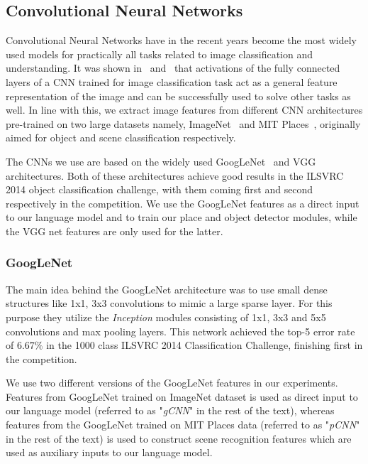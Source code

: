 \subsection{Convolutional Neural Networks}
Convolutional Neural Networks have in the recent years become the most widely
used models for practically all tasks related to image classification and
understanding.
It was shown in~\cite{Donahue2014} and~\cite{Razavian2014CVPR} that activations
of the fully connected layers of a CNN trained for image classification task act
as a general feature representation of the image and can be successfully used to
solve other tasks as well.
In line with this, we extract image features from different CNN architectures
pre-trained on two large datasets namely, ImageNet~\cite{ImagenetOrig} and MIT
Places~\cite{Zhou2014NIPS}, originally aimed for object and scene
classification respectively.

The CNNs we use are based on the widely used
GoogLeNet~\cite{DBLP:journals/corr/SzegedyLJSRAEVR14} and VGG~\cite{Simonyan14c}
architectures. 
Both of these architectures achieve good results in the ILSVRC 2014 object
classification challenge, with them coming first and second respectively in the
competition.
We use the GoogLeNet features as a direct input to our language model and to
train our place and object detector modules, while the VGG net features are only
used for the latter.

\subsubsection{GoogLeNet} 
\label{subsec:gCNN}
The main idea behind the GoogLeNet architecture was to use small dense
structures like 1x1, 3x3 convolutions to mimic a large sparse layer.
For this purpose they utilize the \emph{Inception} modules consisting of 1x1,
3x3 and 5x5 convolutions and max pooling layers.
This network achieved the top-5 error rate of $6.67\%$ in the 1000 class ILSVRC 2014
Classification Challenge, finishing first in the competition.

We use two different versions of the GoogLeNet features in our experiments.
Features from GoogLeNet trained on ImageNet dataset is used as direct input to
our language model (referred to as "\emph{gCNN}" in the rest of the text),
whereas features from the GoogLeNet trained on MIT Places data (referred to as
"\emph{pCNN}" in the rest of the text) is used to construct scene recognition
features which are used as auxiliary inputs to our language model.

